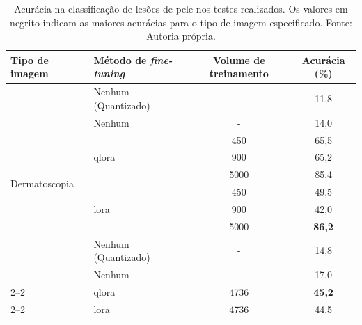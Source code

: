 \begin{table}[ht]
    \centering
    \begin{tabular}{l|l|c|c}
        \hline
        Tipo de imagem                  & Método de \textit{fine-tuning} & Volume de treinamento & Acurácia (\%) \\
        \hline
        \multirow{10}{*}{Dermatoscopia} & Nenhum (Quantizado)            & -                     & 11,8          \\
                                        & Nenhum                         & -                     & 14,0          \\
        \cline{2--2}
                                        & \multirow{3}{*}{\ac{qlora}}    & 450                   & 65,5          \\
                                        &                                & 900                   & 65,2          \\
                                        &                                & 5000                  & 85,4          \\
        \cline{2--2}
                                        & \multirow{3}{*}{\ac{lora}}     & 450                   & 49,5          \\
                                        &                                & 900                   & 42,0          \\
                                        &                                & 5000                  & \textbf{86,2} \\
        \hline
        \multirow{4}{*}{Aproximação}    & Nenhum (Quantizado)            & -                     & 14,8          \\
                                        & Nenhum                         & -                     & 17,0          \\
        \cline{2--2}
                                        & \ac{qlora}                     & 4736                  & \textbf{45,2} \\
        \cline{2--2}
                                        & \ac{lora}                      & 4736                  & 44,5          \\
        \hline
    \end{tabular}
    \label{tab:overall_comparison_skin_lesions}
    \caption{Acurácia na classificação de lesões de pele nos testes realizados. Os valores em
    negrito indicam as maiores acurácias para o tipo de imagem especificado. Fonte: Autoria própria.}
\end{table}

